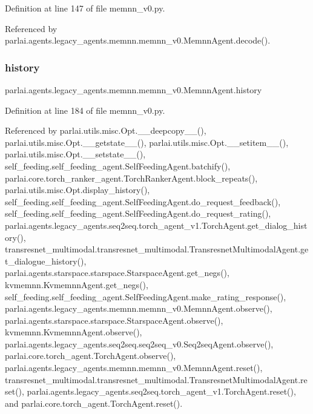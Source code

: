 Definition at line 147 of file memnn\+\_\+v0.\+py.



Referenced by parlai.\+agents.\+legacy\+\_\+agents.\+memnn.\+memnn\+\_\+v0.\+Memnn\+Agent.\+decode().

\mbox{\label{classparlai_1_1agents_1_1legacy__agents_1_1memnn_1_1memnn__v0_1_1MemnnAgent_a86ebdb3ff6941cfb15945a9f3f198f83}} 
\subsubsection{\texorpdfstring{history}{history}}
{\footnotesize\ttfamily parlai.\+agents.\+legacy\+\_\+agents.\+memnn.\+memnn\+\_\+v0.\+Memnn\+Agent.\+history}



Definition at line 184 of file memnn\+\_\+v0.\+py.



Referenced by parlai.\+utils.\+misc.\+Opt.\+\_\+\+\_\+deepcopy\+\_\+\+\_\+(), parlai.\+utils.\+misc.\+Opt.\+\_\+\+\_\+getstate\+\_\+\+\_\+(), parlai.\+utils.\+misc.\+Opt.\+\_\+\+\_\+setitem\+\_\+\+\_\+(), parlai.\+utils.\+misc.\+Opt.\+\_\+\+\_\+setstate\+\_\+\+\_\+(), self\+\_\+feeding.\+self\+\_\+feeding\+\_\+agent.\+Self\+Feeding\+Agent.\+batchify(), parlai.\+core.\+torch\+\_\+ranker\+\_\+agent.\+Torch\+Ranker\+Agent.\+block\+\_\+repeats(), parlai.\+utils.\+misc.\+Opt.\+display\+\_\+history(), self\+\_\+feeding.\+self\+\_\+feeding\+\_\+agent.\+Self\+Feeding\+Agent.\+do\+\_\+request\+\_\+feedback(), self\+\_\+feeding.\+self\+\_\+feeding\+\_\+agent.\+Self\+Feeding\+Agent.\+do\+\_\+request\+\_\+rating(), parlai.\+agents.\+legacy\+\_\+agents.\+seq2seq.\+torch\+\_\+agent\+\_\+v1.\+Torch\+Agent.\+get\+\_\+dialog\+\_\+history(), transresnet\+\_\+multimodal.\+transresnet\+\_\+multimodal.\+Transresnet\+Multimodal\+Agent.\+get\+\_\+dialogue\+\_\+history(), parlai.\+agents.\+starspace.\+starspace.\+Starspace\+Agent.\+get\+\_\+negs(), kvmemnn.\+Kvmemnn\+Agent.\+get\+\_\+negs(), self\+\_\+feeding.\+self\+\_\+feeding\+\_\+agent.\+Self\+Feeding\+Agent.\+make\+\_\+rating\+\_\+response(), parlai.\+agents.\+legacy\+\_\+agents.\+memnn.\+memnn\+\_\+v0.\+Memnn\+Agent.\+observe(), parlai.\+agents.\+starspace.\+starspace.\+Starspace\+Agent.\+observe(), kvmemnn.\+Kvmemnn\+Agent.\+observe(), parlai.\+agents.\+legacy\+\_\+agents.\+seq2seq.\+seq2seq\+\_\+v0.\+Seq2seq\+Agent.\+observe(), parlai.\+core.\+torch\+\_\+agent.\+Torch\+Agent.\+observe(), parlai.\+agents.\+legacy\+\_\+agents.\+memnn.\+memnn\+\_\+v0.\+Memnn\+Agent.\+reset(), transresnet\+\_\+multimodal.\+transresnet\+\_\+multimodal.\+Transresnet\+Multimodal\+Agent.\+reset(), parlai.\+agents.\+legacy\+\_\+agents.\+seq2seq.\+torch\+\_\+agent\+\_\+v1.\+Torch\+Agent.\+reset(), and parlai.\+core.\+torch\+\_\+agent.\+Torch\+Agent.\+reset().

